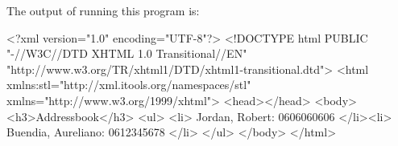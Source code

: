 The output of running this program is:

\begin{code}
    <?xml version="1.0" encoding="UTF-8"?>
    <!DOCTYPE html
         PUBLIC "-//W3C//DTD XHTML 1.0 Transitional//EN"
        "http://www.w3.org/TR/xhtml1/DTD/xhtml1-transitional.dtd">
    <html xmlns:stl="http://xml.itools.org/namespaces/stl"
          xmlns="http://www.w3.org/1999/xhtml">
      <head></head>
      <body>
        <h3>Addressbook</h3>
        <ul>
          <li>
            Jordan,
            Robert:
            0606060606
          </li><li>
            Buendia,
            Aureliano:
            0612345678
          </li>
        </ul>
      </body>
    </html>
\end{code}





